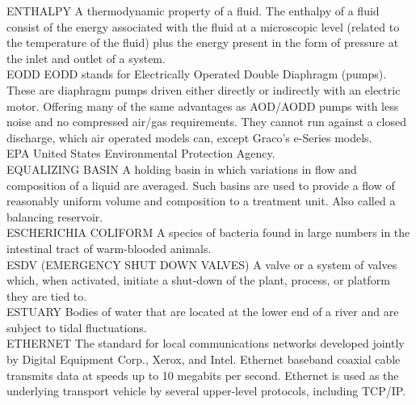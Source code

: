ENTHALPY
A thermodynamic property of a fluid. The enthalpy of a fluid consist of the energy associated with the fluid at a microscopic level (related to the temperature of the fluid) plus the energy present in the form of pressure at the inlet and outlet of a system.
\vspace{0.3cm}\\
EODD
EODD stands for Electrically Operated Double Diaphragm (pumps). These are diaphragm pumps driven either directly or indirectly with an electric motor. Offering many of the same advantages as AOD/AODD pumps with less noise and no compressed air/gas requirements. They cannot run against a closed discharge, which air operated models can, except Graco’s e-Series models.
\vspace{0.3cm}\\
EPA
United States Environmental Protection Agency. 
\vspace{0.3cm}\\
EQUALIZING BASIN
A holding basin in which variations in flow and composition of a liquid are averaged. Such basins are used to provide a flow of reasonably uniform volume and composition to a treatment unit.  Also called a balancing reservoir.
\vspace{0.3cm}\\
ESCHERICHIA COLIFORM
A species of bacteria found in large numbers in the intestinal tract of warm-blooded animals.
\vspace{0.3cm}\\
ESDV (EMERGENCY SHUT DOWN VALVES)
A valve or a system of valves which, when activated, initiate a shut-down of the plant, process, or platform they are tied to.
\vspace{0.3cm}\\
ESTUARY
Bodies of water that are located at the lower end of a river and are subject to tidal fluctuations.
\vspace{0.3cm}\\
ETHERNET
The standard for local communications networks developed jointly by Digital Equipment Corp., Xerox, and Intel. Ethernet baseband coaxial cable transmits data at speeds up to 10 megabits per second. Ethernet is used as the underlying transport vehicle by several upper-level protocols, including TCP/IP.
\vspace{0.3cm}\\

